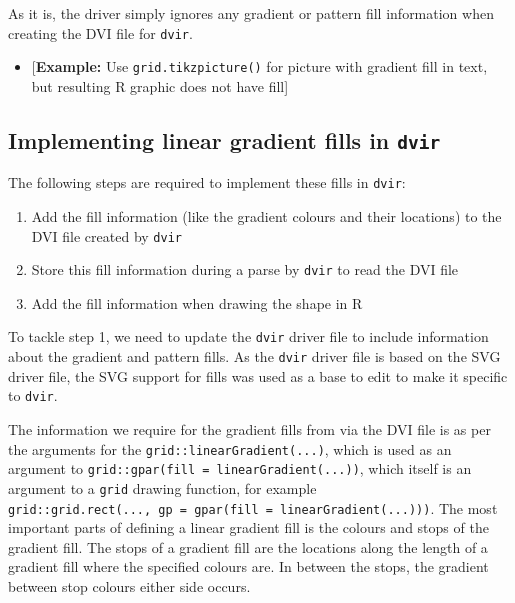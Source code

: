 \documentclass[]{article}
\providecommand{\tightlist}{%
  \setlength{\itemsep}{0pt}\setlength{\parskip}{0pt}}
\begin{document}
As it is, the \Tikz{} driver simply ignores any gradient or pattern fill
information when creating the DVI file for \texttt{dvir}.

\begin{itemize}
\tightlist
\item
  {[}\textbf{Example:} Use \texttt{grid.tikzpicture()} for picture with
  gradient fill in text, but resulting R graphic does not have fill{]}
\end{itemize}

\subsection{\texorpdfstring{Implementing \Tikz{} linear gradient fills
in
\texttt{dvir}}{Implementing  linear gradient fills in dvir}}\label{implementing-linear-gradient-fills-in-dvir}

The following steps are required to implement these \Tikz{} fills in
\texttt{dvir}:

\begin{enumerate}
\def\labelenumi{\arabic{enumi}.}
\item
  Add the fill information (like the gradient colours and their
  locations) to the DVI file created by \texttt{dvir}
\item
  Store this fill information during a parse by \texttt{dvir} to read
  the DVI file
\item
  Add the fill information when drawing the shape in R
\end{enumerate}

To tackle step 1, we need to update the \texttt{dvir} \Tikz{} driver
file to include information about the gradient and pattern fills. As the
\texttt{dvir} \Tikz{} driver file is based on the SVG \Tikz{} driver
file, the SVG support for \Tikz{} fills was used as a base to edit to
make it specific to \texttt{dvir}.

The information we require for the gradient fills from \Tikz{} via the
DVI file is as per the arguments for the
\texttt{grid::linearGradient(...)}, which is used as an argument to
\texttt{grid::gpar(fill\ =\ linearGradient(...))}, which itself is an
argument to a \texttt{grid} drawing function, for example
\texttt{grid::grid.rect(...,\ gp\ =\ gpar(fill\ =\ linearGradient(...)))}.
The most important parts of defining a linear gradient fill is the
colours and stops of the gradient fill. The stops of a gradient fill are
the locations along the length of a gradient fill where the specified
colours are. In between the stops, the gradient between stop colours
either side occurs.
\end{document}
